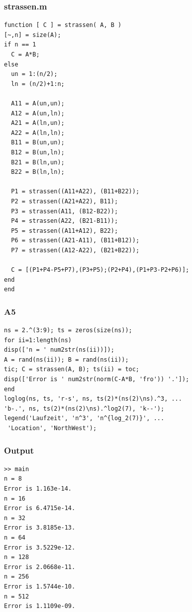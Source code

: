 \documentclass[ngerman,12pt]{article}
\begin{document}
\lstset{language=Matlab,basicstyle=\ttfamily,columns=fixed}
\subsubsection*{strassen.m}
\begin{lstlisting}[frame=single]
function [ C ] = strassen( A, B )
[~,n] = size(A);
if n == 1
  C = A*B;
else
  un = 1:(n/2);
  ln = (n/2)+1:n;
  
  A11 = A(un,un);
  A12 = A(un,ln);
  A21 = A(ln,un);
  A22 = A(ln,ln);
  B11 = B(un,un);
  B12 = B(un,ln);
  B21 = B(ln,un);
  B22 = B(ln,ln);
  
  P1 = strassen((A11+A22), (B11+B22));
  P2 = strassen((A21+A22), B11);
  P3 = strassen(A11, (B12-B22));
  P4 = strassen(A22, (B21-B11));
  P5 = strassen((A11+A12), B22);
  P6 = strassen((A21-A11), (B11+B12));
  P7 = strassen((A12-A22), (B21+B22));
  
  C = [(P1+P4-P5+P7),(P3+P5);(P2+P4),(P1+P3-P2+P6)];
end
end
\end{lstlisting}
\filbreak

\subsubsection*{A5}
\begin{lstlisting}[frame=single]
ns = 2.^(3:9); ts = zeros(size(ns));
for ii=1:length(ns)
disp(['n = ' num2str(ns(ii))]);
A = rand(ns(ii)); B = rand(ns(ii));
tic; C = strassen(A, B); ts(ii) = toc;
disp(['Error is ' num2str(norm(C-A*B, 'fro')) '.']);
end
loglog(ns, ts, 'r-s', ns, ts(2)*(ns(2)\ns).^3, ...
'b-.', ns, ts(2)*(ns(2)\ns).^log2(7), 'k--');
legend('Laufzeit', 'n^3', 'n^{log_2(7)}', ...
 'Location', 'NorthWest');
\end{lstlisting}

\subsubsection*{Output}
\begin{lstlisting}[frame=single]
>> main
n = 8
Error is 1.163e-14.
n = 16
Error is 6.4715e-14.
n = 32
Error is 3.8185e-13.
n = 64
Error is 3.5229e-12.
n = 128
Error is 2.0668e-11.
n = 256
Error is 1.5744e-10.
n = 512
Error is 1.1109e-09.
\end{lstlisting}
\end{document}
